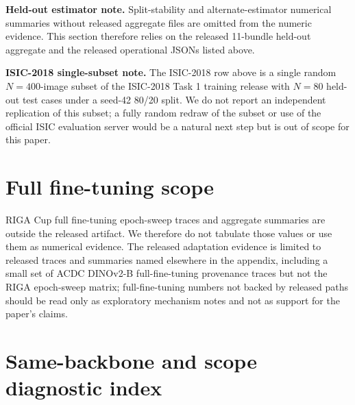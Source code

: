 \textbf{Held-out estimator note.} Split-stability and alternate-estimator numerical summaries without released aggregate files are omitted from the numeric evidence. This section therefore relies on the released 11-bundle held-out aggregate and the released operational JSONs listed above.

\textbf{ISIC-2018 single-subset note.} The ISIC-2018 row above is a single random $N{=}400$-image subset of the ISIC-2018 Task 1 training release with $N{=}80$ held-out test cases under a seed-42 80/20 split. We do not report an independent replication of this subset; a fully random redraw of the subset or use of the official ISIC evaluation server would be a natural next step but is out of scope for this paper.

\section{Full fine-tuning scope}
\label{app:ftsweep}

RIGA Cup full fine-tuning epoch-sweep traces and aggregate summaries are outside
the released artifact. We therefore do not tabulate those values or use them as
numerical evidence. The released adaptation evidence is limited to
released traces and summaries named elsewhere in the appendix, including a small
set of ACDC DINOv2-B full-fine-tuning provenance traces but not the RIGA
epoch-sweep matrix; full-fine-tuning numbers not backed by released paths should
be read only as exploratory mechanism notes and not as support for the paper's
claims.

\section{Same-backbone and scope diagnostic index}
\label{app:lever}


